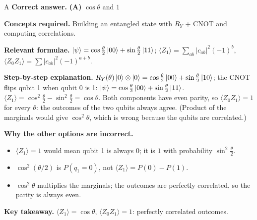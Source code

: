 \documentclass[11pt,a4paper]{article}
\newcommand{\qsep}{\par\vspace{2pt}{\color{black!15}\hrule}\vspace{4pt}}
\begin{document}
\begin{solbox}{A}
\textbf{\color{brand}Correct answer.} \textcolor{okgreen}{\textbf{(A)}} $\cos\theta$ and $1$

\textbf{\color{brand}Concepts required.} Building an entangled state with $R_Y$ + CNOT and computing correlations.

\textbf{\color{brand}Relevant formulae.} $\ket\psi = \cos\frac\theta2\ket{00} + \sin\frac\theta2\ket{11}$; $\langle Z_1\rangle = \sum_{ab}|c_{ab}|^2(-1)^b$, $\langle Z_0Z_1\rangle = \sum|c_{ab}|^2(-1)^{a+b}$.

\textbf{\color{brand}Step-by-step explanation.} $R_Y(\theta)\ket0\otimes\ket0 = \cos\frac\theta2\ket{00} + \sin\frac\theta2\ket{10}$; the CNOT flips qubit 1 when qubit 0 is 1:
$\ket\psi = \cos\frac\theta2\ket{00} + \sin\frac\theta2\ket{11}$.
$\langle Z_1\rangle = \cos^2\frac\theta2 - \sin^2\frac\theta2 = \cos\theta$. Both components have even parity, so
$\langle Z_0Z_1\rangle = 1$ for every $\theta$: the outcomes of the two qubits always agree. (Product of the marginals would give
$\cos^2\theta$, which is wrong because the qubits are correlated.)

\textbf{\color{brand}Why the other options are incorrect.}
\begin{itemize}[leftmargin=2.4em, itemsep=1pt, topsep=2pt]
\item[\textbf{(B)}] $\langle Z_1\rangle = 1$ would mean qubit 1 is always $0$; it is $1$ with probability $\sin^2\frac\theta2$.
\item[\textbf{(C)}] $\cos^2(\theta/2)$ is $P(q_1 = 0)$, not $\langle Z_1\rangle = P(0) - P(1)$.
\item[\textbf{(D)}] $\cos^2\theta$ multiplies the marginals; the outcomes are perfectly correlated, so the parity is always even.
\end{itemize}
\textbf{\color{brand}Key takeaway.} $\langle Z_1\rangle = \cos\theta$, $\langle Z_0Z_1\rangle = 1$: perfectly correlated outcomes.
\end{solbox}
\qsep
\end{document}
